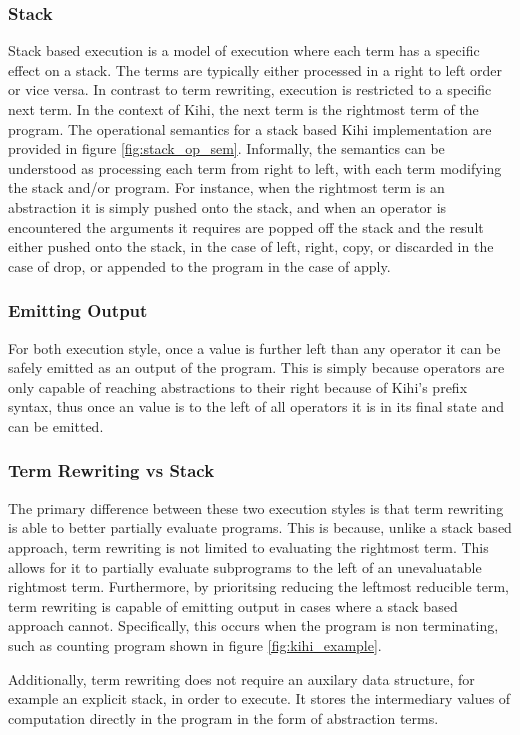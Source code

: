 \subsubsection*{Stack}
Stack based execution is a model of execution where each term has a specific effect on a stack. The terms are typically either processed in a right to left order or vice versa. In contrast to term rewriting, execution is restricted to a specific next term. In the context of Kihi, the next term is the rightmost term of the program. The operational semantics for a stack based Kihi implementation are provided in figure \ref{fig:stack_op_sem}. Informally, the semantics can be understood as processing each term from right to left, with each term modifying the stack and/or program. For instance, when the rightmost term is an abstraction it is simply pushed onto the stack, and when an operator is encountered the arguments it requires are popped off the stack and the result either pushed onto the stack, in the case of left, right, copy, or discarded in the case of drop, or appended to the program in the case of apply.

\subsubsection{Emitting Output}
For both execution style, once a value is further left than any operator it can be safely emitted as an output of the program. This is simply because operators are only capable of reaching abstractions to their right because of Kihi's prefix syntax, thus once an value is to the left of all operators it is in its final state and can be emitted.

\subsubsection{Term Rewriting vs Stack}
The primary difference between these two execution styles is that term rewriting is able to better partially evaluate programs. This is because, unlike a stack based approach, term rewriting is not limited to evaluating the rightmost term. This allows for it to partially evaluate subprograms to the left of an unevaluatable rightmost term. Furthermore, by prioritsing reducing the leftmost reducible term, term rewriting is capable of emitting output in cases where a stack based approach cannot. Specifically, this occurs when the program is non terminating, such as counting program shown in figure \ref{fig:kihi_example}.

Additionally, term rewriting does not require an auxilary data structure, for example an explicit stack, in order to execute. It stores the intermediary values of computation directly in the program in the form of abstraction terms.

